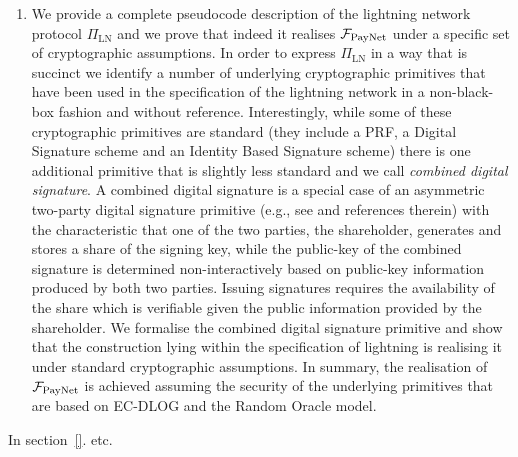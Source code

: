 \begin{enumerate}
\item We provide a complete pseudocode description  of the lightning network protocol $\Pi_{\mathrm{LN}}$
and we prove that indeed it 
realises  $\mathcal{F}_{\mathrm{PayNet}}{}$ under a specific set of cryptographic 
assumptions. In order to express $\Pi_{\mathrm{LN}}$ in a way that is succinct we identify a number of underlying cryptographic primitives that have been used in the specification of the lightning network in a non-black-box fashion and without reference.  Interestingly, while some of these cryptographic primitives are standard (they include a PRF, a Digital Signature scheme and an Identity Based Signature scheme) there is one additional primitive that is slightly less standard and we call  {\em combined digital signature}. A combined digital signature is a special case of an asymmetric  two-party digital signature primitive (e.g., see \cite{DBLP:conf/ndss/NicolosiKDM03} and references therein) with the characteristic that one of the two parties, the shareholder, generates and stores a share of the signing key, while the public-key of the combined signature is determined non-interactively based on public-key information produced by both two parties.  Issuing signatures requires the availability of the share which is verifiable given the public information provided by the shareholder.   We formalise the combined digital signature primitive and show that the construction lying within the specification of lightning is realising it under standard cryptographic assumptions. In summary, the realisation of  $\mathcal{F}_{\mathrm{PayNet}}{}$ is achieved assuming the security of the underlying primitives that are based on EC-DLOG and the Random Oracle model. 
\end{enumerate}

 In section~\ref{}. etc. 


